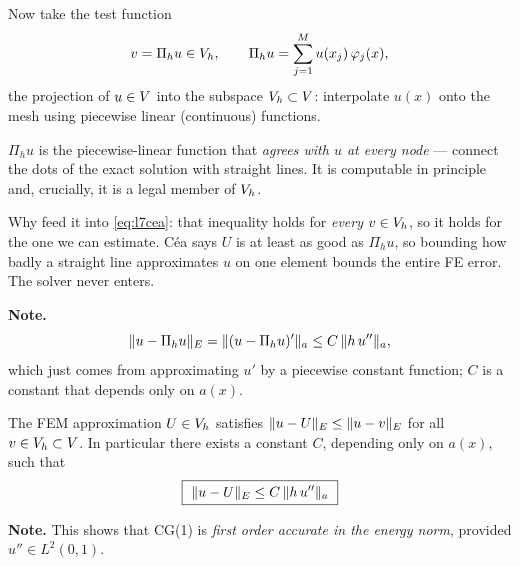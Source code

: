 Now take the test function
\begin{equation}\label{eq:l7interp}
  v=\Pi_h u\in V_{h},
  \qquad
  \Pi_h u=\sum_{j=1}^{M} u(x_j)\,\varphi_j(x),
\end{equation}
the projection of $u\in V$ into the subspace $V_{h}\subset V$: interpolate
$u(x)$ onto the mesh using piecewise linear (continuous) functions.


\begin{intuition}
$\Pi_h u$ is the piecewise-linear function that \emph{agrees with $u$ at every
node} --- connect the dots of the exact solution with straight lines. It is
computable in principle and, crucially, it is a legal member of $V_{h}$.

Why feed it into \eqref{eq:l7cea}: that inequality holds for \emph{every}
$v\in V_{h}$, so it holds for the one we can estimate. C\'ea says $U$ is at least
as good as $\Pi_h u$, so bounding how badly a straight line approximates $u$ on
one element bounds the entire FE error. The solver never enters.
\end{intuition}

\medskip\noindent\textbf{Note.}
\begin{equation}\label{eq:l7interperr}
  \lVert u-\Pi_h u\rVert_{E}=\lVert(u-\Pi_h u)'\rVert_{a}\le C\,\lVert h\,u''\rVert_{a},
\end{equation}
which just comes from approximating $u'$ by a piecewise constant function; $C$
is a constant that depends only on $a(x)$.

\begin{theorem}\label{thm:l7apriori}
The FEM approximation $U\in V_{h}$ satisfies $\lVert u-U\rVert_{E}\le\lVert u-v\rVert_{E}$ for
all $v\in V_{h}\subset V$. In particular there exists a constant $C$, depending
only on $a(x)$, such that
\begin{equation}\label{eq:l7thm}
  \boxed{\ \lVert u-U\rVert_{E}\le C\,\lVert h\,u''\rVert_{a}\ }
\end{equation}
\end{theorem}

\medskip\noindent\textbf{Note.} This shows that CG(1) is \emph{first order
accurate in the energy norm}, provided $u''\in L^{2}(0,1)$.


